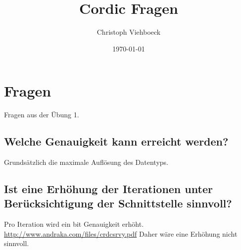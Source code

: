 \documentclass[11pt]{article}
\author{Christoph Viehboeck}
\date{\today}
\title{Cordic Fragen}
\begin{document}
\maketitle
\tableofcontents


\section{Fragen}
\label{sec:orgdc8e1c6}
Fragen aus der Übung 1.

\subsection{Welche Genauigkeit kann erreicht werden?}
\label{sec:orga6d32cc}
Grundsätzlich die maximale Auflösung des Datentyps.

\subsection{Ist eine Erhöhung der Iterationen unter Berücksichtigung der Schnittstelle sinnvoll?}
\label{sec:org3dc476e}
Pro Iteration wird ein bit Genauigkeit
erhöht. \url{http://www.andraka.com/files/crdcsrvy.pdf} Daher wäre eine
Erhöhung nicht sinnvoll.
\end{document}
